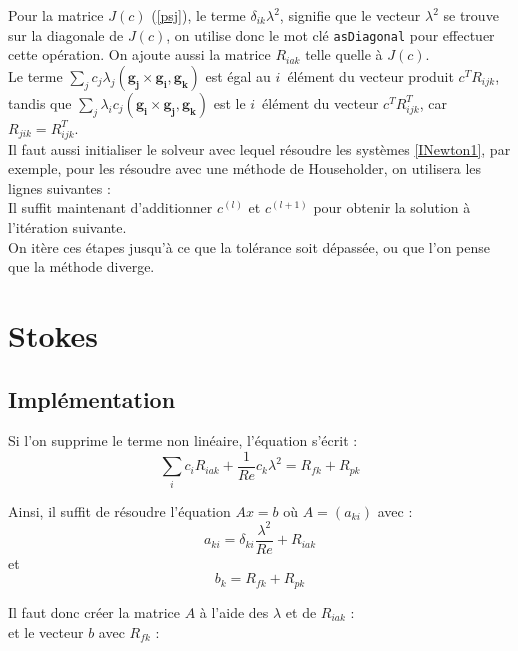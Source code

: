 Pour la matrice $J(c)$ (\ref{psj}), le terme $\delta_{ik}\lambda^2$, signifie que le vecteur $\lambda^2$ se trouve sur la diagonale de $J(c)$, on utilise donc le mot clé \texttt{asDiagonal} pour effectuer cette opération. On ajoute aussi la matrice $R_{iak}$ telle quelle à $J(c)$.\\
Le terme $\sum_j c_j\lambda_j (\mathbf{g_j}\times\mathbf{g_i},\mathbf{g_k})$ est égal au $i$\ieme\ élément du vecteur produit $c^TR_{ijk}$, tandis que $\sum_j\lambda_i c_j (\mathbf{g_i}\times\mathbf{g_j},\mathbf{g_k})$ est le $i$\ieme\ élément du vecteur $c^TR_{ijk}^T$, car $R_{jik}=R_{ijk}^T$.\\


Il faut aussi initialiser le solveur avec lequel résoudre les systèmes \ref{INewton1}, par exemple, pour les résoudre avec une méthode de Householder, on utilisera les lignes suivantes :\\


Il suffit maintenant d'additionner $c^{(l)}$ et $c^{(l+1)}$ pour obtenir la solution à l'itération suivante.\\


On itère ces étapes jusqu'à ce que la tolérance soit dépassée, ou que l'on pense que la méthode diverge.

\section{Stokes}
\subsection{Implémentation}
Si l'on supprime le terme non linéaire, l'équation s'écrit :
\[ \sum_i c_iR_{iak} +\frac{1}{Re}c_k\lambda^2 = R_{fk} + R_{pk} \]

Ainsi, il suffit de résoudre l'équation $Ax=b$ où $A=(a_{ki})$ avec :
\[ a_{ki} = \delta_{ki}\frac{\lambda^2}{Re} + R_{iak} \]
et
\[ b_k = R_{fk} + R_{pk} \]

Il faut donc créer la matrice $A$ à l'aide des $\lambda$ et de $R_{iak}$ :\\

et le vecteur $b$ avec $R_{fk}$ :\\



